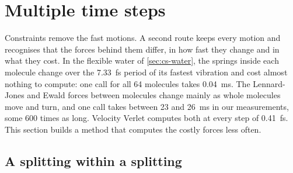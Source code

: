 \section{Multiple time steps}
\label{sec:cs-respa}

Constraints remove the fast motions. A second route keeps every motion
and recognises that the forces behind them differ, in how fast they change
and in what they cost. In the flexible water of \cref{sec:cs-water}, the
springs inside each molecule change over the \SI{7.33}{\femto\second}
period of its fastest vibration and cost almost nothing to compute: one
call for all 64 molecules takes \SI{0.04}{\milli\second}. The
Lennard-Jones and Ewald forces between molecules change mainly as whole
molecules move and turn, and one call takes between 23 and
\SI{26}{\milli\second} in our measurements, some 600 times as long. Velocity Verlet
computes both at every step of \SI{0.41}{\femto\second}. This section
builds a method that computes the costly forces less often.

\subsection*{A splitting within a splitting}

